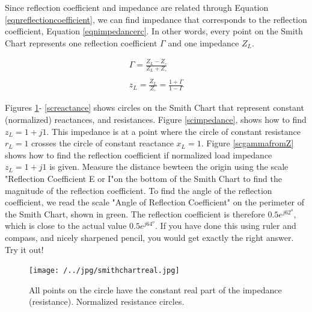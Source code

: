 \documentclass{ximera}
\begin{document}
Since reflection coefficient and  impedance are related through Equation \ref{eqnreflectioncoefficient}, we can find impedance that corresponds to the  reflection coefficient, Equation \ref{eqnimpedancerc}. In other words, every point on the Smith Chart represents one reflection coefficient $\Gamma$ and one impedance $Z_L$. 



\begin{eqnarray}
\Gamma = \frac{Z_L-Z_\circ}{Z_L+Z_\circ} \label{eqnreflectioncoefficient} \\ \nonumber \\
z_L = \frac{Z_L}{Z_\circ} = \frac{ 1+ \Gamma}{1- \Gamma } \label{eqnimpedancerc}
\end{eqnarray}

Figures \ref{scresistance}- \ref{screactance}  shows circles on the Smith Chart that represent constant (normalized) reactances, and resistances. Figure \ref{scimpedance}, shows how to find  $z_L=1+j 1$. This impedance is at a point where the circle of constant resistance $r_L=1$ crosses the circle of constant reactance $x_L=1$.   Figure \ref{scgammafromZ} shows how to find the reflection coefficient if normalized load  impedance $z_L=1+j 1$ is given. Measure the distance bewteen the origin using the scale "Reflection Coefficient E or I"on the bottom of the Smith Chart to find the magnitude of the reflection coefficient. To find the angle of the reflection coefficient, we read the scale "Angle of Reflection Coefficient" on the perimeter of the Smith Chart, shown in green. The reflection coefficient is therefore $0.5 e^{j 62^o}$, which is close to the actual value   $0.5 e^{j 64^o}$. If you have done this using ruler and compass, and nicely sharpened pencil, you would get exactly the right answer. Try it out!

\begin{figure}[htbp]
\begin{center}
\texttt{[image: /../jpg/smithchartreal.jpg]}
\end{center}
\caption{All points on the circle have the constant real part of the impedance (resistance). Normalized resistance circles.}
\label{scresistance}
\end{figure}
\end{document}
